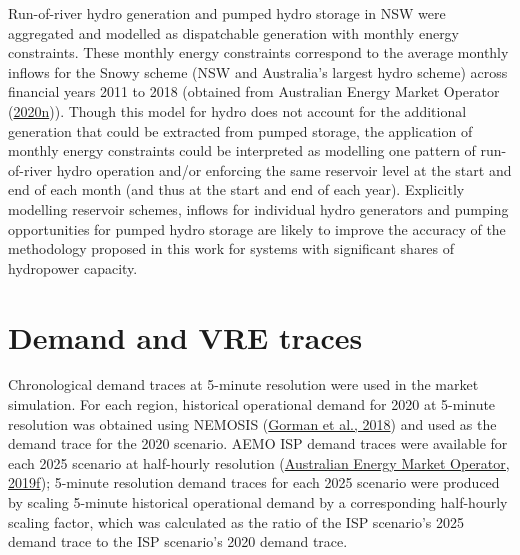 \documentclass[12pt,a4paper,]{report}
\begin{document}
Run-of-river hydro generation and pumped hydro storage in NSW were
aggregated and modelled as dispatchable generation with monthly energy
constraints. These monthly energy constraints correspond to the average
monthly inflows for the Snowy scheme (NSW and Australia's largest hydro
scheme) across financial years 2011 to 2018 (obtained from Australian
Energy Market Operator
(\protect\hyperlink{ref-australianenergymarketoperator2020InputsAssumptions2020}{2020n})).
Though this model for hydro does not account for the additional
generation that could be extracted from pumped storage, the application
of monthly energy constraints could be interpreted as modelling one
pattern of run-of-river hydro operation and/or enforcing the same
reservoir level at the start and end of each month (and thus at the
start and end of each year). Explicitly modelling reservoir schemes,
inflows for individual hydro generators and pumping opportunities for
pumped hydro storage are likely to improve the accuracy of the
methodology proposed in this work for systems with significant shares of
hydropower capacity.

\hypertarget{demand-and-vre-traces}{%
\section{Demand and VRE traces}\label{demand-and-vre-traces}}

Chronological demand traces at 5-minute resolution were used in the
market simulation. For each region, historical operational demand for
2020 at 5-minute resolution was obtained using NEMOSIS
(\protect\hyperlink{ref-gormanNEMOSISNEMOpen2018}{Gorman et al., 2018})
and used as the demand trace for the 2020 scenario. AEMO ISP demand
traces were available for each 2025 scenario at half-hourly resolution
(\protect\hyperlink{ref-australianenergymarketoperator2020DraftISP2019a}{Australian
Energy Market Operator, 2019f}); 5-minute resolution demand traces for
each 2025 scenario were produced by scaling 5-minute historical
operational demand by a corresponding half-hourly scaling factor, which
was calculated as the ratio of the ISP scenario's 2025 demand trace to
the ISP scenario's 2020 demand trace.
\end{document}
